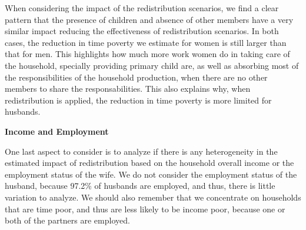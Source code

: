 \documentclass[
  11pt,
]{article}
\begin{document}
When considering the impact of the redistribution scenarios, we find a
clear pattern that the presence of children and absence of other members
have a very similar impact reducing the effectiveness of redistribution
scenarios. In both cases, the reduction in time poverty we estimate for
women is still larger than that for men. This highlights how much more
work women do in taking care of the household, specially providing
primary child are, as well as absorbing most of the responsibilities of
the household production, when there are no other members to share the
responsabilities. This also explains why, when redistribution is
applied, the reduction in time poverty is more limited for husbands.

\textbf{Income and Employment}

One last aspect to consider is to analyze if there is any heterogeneity
in the estimated impact of redistribution based on the household overall
income or the employment status of the wife. We do not consider the
employment status of the husband, because 97.2\% of husbands are
employed, and thus, there is little variation to analyze. We should also
remember that we concentrate on households that are time poor, and thus
are less likely to be income poor, because one or both of the partners
are employed.
\end{document}
